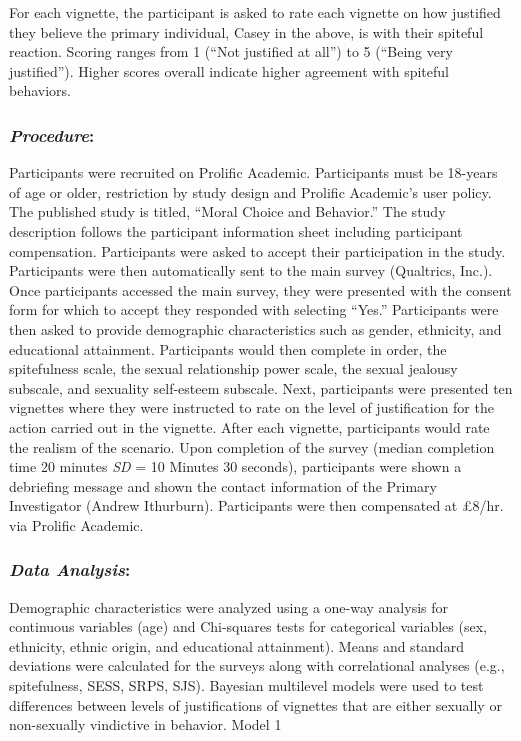 \documentclass[
  english,
  a4paper]{apa7}
\begin{document}
For each vignette, the participant is asked to rate each vignette on how justified they believe the primary individual, Casey in the above, is with their spiteful reaction. Scoring ranges from 1 (``Not justified at all'') to 5 (``Being very justified''). Higher scores overall indicate higher agreement with spiteful behaviors.

\hypertarget{procedure}{%
\subsubsection{\texorpdfstring{\emph{Procedure}:}{Procedure:}}\label{procedure}}

Participants were recruited on Prolific Academic. Participants must be 18-years of age or older, restriction by study design and Prolific Academic's user policy. The published study is titled, ``Moral Choice and Behavior.'' The study description follows the participant information sheet including participant compensation. Participants were asked to accept their participation in the study. Participants were then automatically sent to the main survey (Qualtrics, Inc.).\\
Once participants accessed the main survey, they were presented with the consent form for which to accept they responded with selecting ``Yes.'' Participants were then asked to provide demographic characteristics such as gender, ethnicity, and educational attainment. Participants would then complete in order, the spitefulness scale, the sexual relationship power scale, the sexual jealousy subscale, and sexuality self-esteem subscale. Next, participants were presented ten vignettes where they were instructed to rate on the level of justification for the action carried out in the vignette. After each vignette, participants would rate the realism of the scenario. Upon completion of the survey (median completion time 20 minutes \emph{SD} = 10 Minutes 30 seconds), participants were shown a debriefing message and shown the contact information of the Primary Investigator (Andrew Ithurburn). Participants were then compensated at £8/hr. via Prolific Academic.

\hypertarget{data-analysis}{%
\subsubsection{\texorpdfstring{\emph{Data Analysis}:}{Data Analysis:}}\label{data-analysis}}

Demographic characteristics were analyzed using a one-way analysis for continuous variables (age) and Chi-squares tests for categorical variables (sex, ethnicity, ethnic origin, and educational attainment). Means and standard deviations were calculated for the surveys along with correlational analyses (e.g., spitefulness, SESS, SRPS, SJS).
Bayesian multilevel models were used to test differences between levels of justifications of vignettes that are either sexually or non-sexually vindictive in behavior. Model 1
\end{document}
